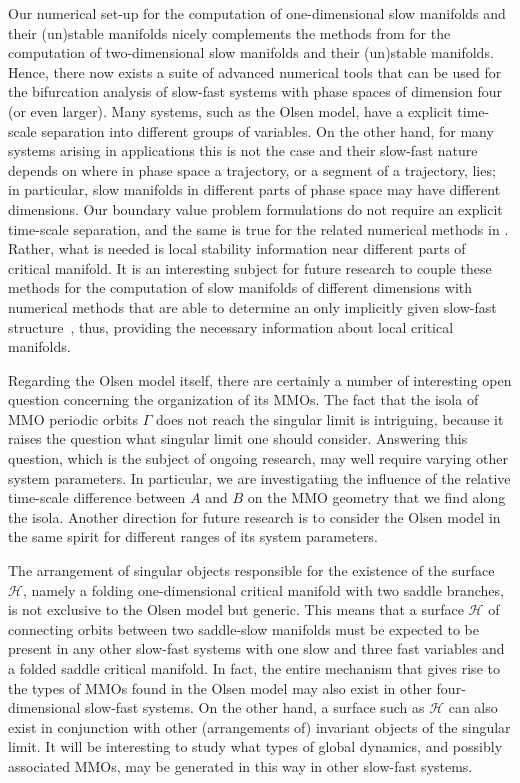 \documentclass{ws-ijbc}
\begin{document}
Our numerical set-up for the computation of one-dimensional slow manifolds and their (un)stable manifolds nicely complements the methods from \cite{Cris_paper} for the computation of two-dimensional slow manifolds and their (un)stable manifolds. Hence, there now exists a suite of advanced numerical tools that can be used for the bifurcation analysis of slow-fast systems with phase spaces of dimension four (or even larger). Many systems, such as the Olsen model, have a explicit time-scale separation into different groups of variables. On the other hand, for many systems arising in applications this is not the case and their slow-fast nature depends on where in phase space a trajectory, or a segment of a trajectory, lies; in particular, slow manifolds in different parts of phase space may have different dimensions. Our boundary value problem formulations do not require an explicit time-scale separation, and the same is true for the related numerical methods in \cite{homotopy_example, Cris_paper,Saeed_Paper, Jose_Paper}. Rather, what is needed is local stability information near different parts of critical manifold. It is an interesting subject for future research to couple these methods for the computation of slow manifolds of different dimensions with numerical methods that are able to determine an only implicitly given slow-fast structure~\cite{Lizarraga_paper, Wechselberger_book}, thus, providing the necessary information about local critical manifolds.

Regarding the Olsen model itself, there are certainly a number of interesting open question concerning the organization of its MMOs. The fact that the isola of MMO periodic orbits $\Gamma$ does not reach the singular limit is intriguing, because it raises the question what singular limit one should consider. Answering this question, which is the subject of ongoing research, may well require varying other system parameters. In particular, we are investigating the influence of the relative time-scale difference between $A$ and $B$ on the MMO geometry that we find along the isola. Another direction for future research is to consider the Olsen model in the same spirit for different ranges of its system parameters. 

The arrangement of singular objects responsible for the existence of the surface $\mathscr{H}$, namely a folding one-dimensional critical manifold with two saddle branches, is not exclusive to the Olsen model but generic. This means that a surface $\mathscr{H}$ of connecting orbits between two saddle-slow manifolds must be expected to be present in any other slow-fast systems with one slow and three fast variables and a folded saddle critical manifold. In fact, the entire mechanism that gives rise to the types of MMOs found in the Olsen model may also exist in other four-dimensional slow-fast systems. On the other hand, a surface such as $\mathscr{H}$ can also exist in conjunction with other (arrangements of) invariant objects of the singular limit. It will be interesting to study what types of global dynamics, and possibly associated MMOs, may be generated in this way in other slow-fast systems. 
\end{document}
